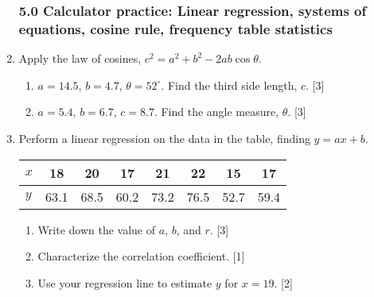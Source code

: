 \documentclass[12pt, twoside]{article}
\begin{document}
\begin{enumerate}
    \subsubsection*{5.0 Calculator practice: Linear regression, systems of equations, cosine rule, frequency table statistics}

    \item Apply the law of cosines, $c^2=a^2+b^2-2ab \cos \theta$.
    \begin{enumerate}
        \item $a=14.5$, $b=4.7$, $\theta = 52^\circ$. Find the third side length, $c$. \hfill [3]
        \item $a=5.4$, $b=6.7$, $c=8.7$. Find the angle measure, $\theta$. \hfill [3]
    \end{enumerate}

    \item Perform a linear regression on the data in the table, finding $y=ax+b$. 
            \begin{center}
            \begin{tabular}{|l|c|c|c|c|c|c|c|}
                \hline
                $x$ & 18 & 20 & 17 & 21 & 22 & 15 & 17 \\ 
                \hline 
                $y$ & 63.1 & 68.5 & 60.2 & 73.2 & 76.5 & 52.7 & 59.4 \\ 
                \hline 
                \end{tabular}
            \end{center}
            \begin{enumerate}
                \item Write down the value of $a$, $b$, and $r$. \hfill [3]
                \item Characterize the correlation coefficient. \hfill [1]
                \item Use your regression line to estimate $y$ for $x=19$. \hfill [2]
            \end{enumerate}
        

\end{enumerate}
\end{document}
